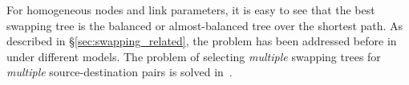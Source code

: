 For homogeneous nodes and link parameters, it is easy to see that the best swapping tree is the balanced or almost-balanced tree over the shortest path.
As described in \S\ref{sec:swapping_related}, the \spp problem has been addressed before in~\cite{sigcomm20, caleffi} under different models. 
The problem of selecting \textit{multiple} swapping trees for \textit{multiple} source-destination pairs is solved in~\cite{swapping-tqe-22}.









